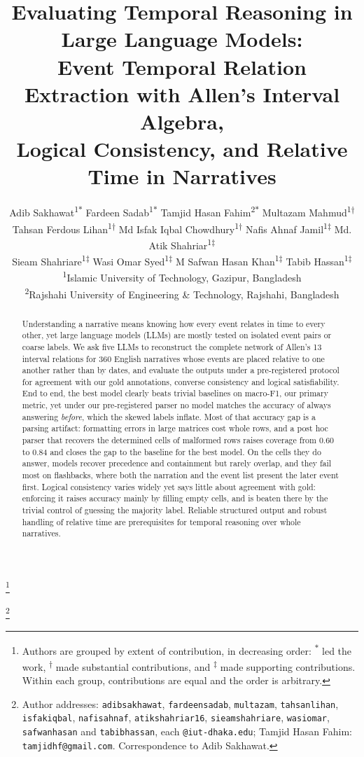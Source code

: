 \documentclass[11pt]{article}
\title{Evaluating Temporal Reasoning in Large Language Models:\\ Event Temporal Relation Extraction with Allen's Interval Algebra,\\ Logical Consistency, and Relative Time in Narratives}
\author{
Adib Sakhawat\textsuperscript{1$*$} \quad
Fardeen Sadab\textsuperscript{1$*$} \quad
Tamjid Hasan Fahim\textsuperscript{2$*$} \quad
Multazam Mahmud\textsuperscript{1$\dagger$} \\
Tahsan Ferdous Lihan\textsuperscript{1$\dagger$} \quad
Md Isfak Iqbal Chowdhury\textsuperscript{1$\dagger$} \quad
Nafis Ahnaf Jamil\textsuperscript{1$\ddagger$} \quad
Md. Atik Shahriar\textsuperscript{1$\ddagger$} \\
Sieam Shahriare\textsuperscript{1$\ddagger$} \quad
Wasi Omar Syed\textsuperscript{1$\ddagger$} \quad
M Safwan Hasan Khan\textsuperscript{1$\ddagger$} \quad
Tabib Hassan\textsuperscript{1$\ddagger$} \\[2pt]
\textsuperscript{1}Islamic University of Technology, Gazipur, Bangladesh \\
\textsuperscript{2}Rajshahi University of Engineering \& Technology, Rajshahi, Bangladesh
}
\newcommand\blfootnote[1]{%
  \begingroup
  \renewcommand\thefootnote{}\footnote{#1}%
  \addtocounter{footnote}{-1}%
  \endgroup
}
\begin{document}
\maketitle

\blfootnote{Authors are grouped by extent of contribution, in decreasing order:
\textsuperscript{$*$} led the work, \textsuperscript{$\dagger$} made substantial
contributions, and \textsuperscript{$\ddagger$} made supporting contributions.
Within each group, contributions are equal and the order is arbitrary.}
\blfootnote{Author addresses: \texttt{adibsakhawat}, \texttt{fardeensadab}, \texttt{multazam},
\texttt{tahsanlihan}, \texttt{isfakiqbal}, \texttt{nafisahnaf}, \texttt{atikshahriar16},
\texttt{sieamshahriare}, \texttt{wasiomar}, \texttt{safwanhasan} and
\texttt{tabibhassan}, each \texttt{@iut-dhaka.edu}; Tamjid Hasan Fahim:
\texttt{tamjidhf@gmail.com}. Correspondence to Adib Sakhawat.}

\begin{abstract}
Understanding a narrative means knowing how every event relates in time to every other, yet large language models (LLMs) are mostly tested on isolated event pairs or coarse labels. We ask five LLMs to reconstruct the complete network of Allen's 13 interval relations for 360 English narratives whose events are placed relative to one another rather than by dates, and evaluate the outputs under a pre-registered protocol for agreement with our gold annotations, converse consistency and logical satisfiability. End to end, the best model clearly beats trivial baselines on macro-F1, our primary metric, yet under our pre-registered parser no model matches the accuracy of always answering \emph{before}, which the skewed labels inflate. Most of that accuracy gap is a parsing artifact: formatting errors in large matrices cost whole rows, and a post hoc parser that recovers the determined cells of malformed rows raises coverage from 0.60 to 0.84 and closes the gap to the baseline for the best model. On the cells they do answer, models recover precedence and containment but rarely overlap, and they fail most on flashbacks, where both the narration and the event list present the later event first. Logical consistency varies widely yet says little about agreement with gold: enforcing it raises accuracy mainly by filling empty cells, and is beaten there by the trivial control of guessing the majority label. Reliable structured output and robust handling of relative time are prerequisites for temporal reasoning over whole narratives.
\end{abstract}
\end{document}
